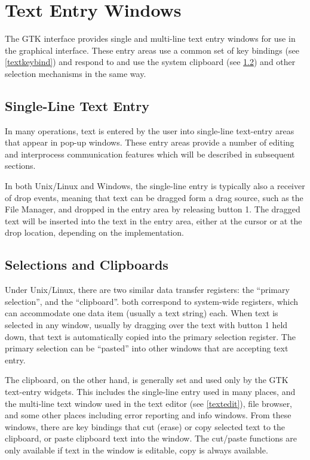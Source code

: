 \section{Text Entry Windows}

The GTK interface provides single and multi-line text entry windows
for use in the graphical interface.  These entry areas use a common
set of key bindings (see \ref{textkeybind}) and respond to and use the
system clipboard (see \ref{clipboard}) and other selection mechanisms
in the same way.


\subsection{Single-Line Text Entry}

In many operations, text is entered by the user into single-line
text-entry areas that appear in pop-up windows.  These entry areas
provide a number of editing and interprocess communication features
which will be described in subsequent sections.

In both Unix/Linux and Windows, the single-line entry is typically
also a receiver of drop events, meaning that text can be dragged form
a drag source, such as the {\cb File Manager}, and dropped in the
entry area by releasing button 1.  The dragged text will be inserted
into the text in the entry area, either at the cursor or at the drop
location, depending on the implementation.


\subsection{Selections and Clipboards}
\label{clipboard}
 
Under Unix/Linux, there are two similar data transfer registers:  the
``primary selection'', and the ``clipboard''.  both correspond to
system-wide registers, which can accommodate one data item (usually a
text string) each.  When text is selected in any window, usually by
dragging over the text with button 1 held down, that text is
automatically copied into the primary selection register.  The primary
selection can be ``pasted'' into other windows that are accepting text
entry.

The clipboard, on the other hand, is generally set and used only by
the GTK text-entry widgets.  This includes the single-line entry used
in many places, and the multi-line text window used in the text editor
(see \ref{textedit}), file browser, and some other places including
error reporting and info windows.  From these windows, there are key
bindings that cut (erase) or copy selected text to the clipboard, or
paste clipboard text into the window.  The cut/paste functions are
only available if text in the window is editable, copy is always
available.

